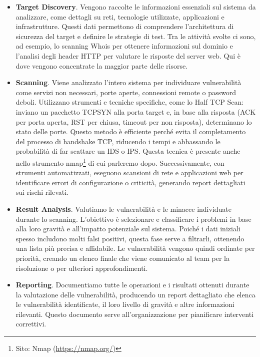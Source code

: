         \begin{itemize}
            \item \textbf{Target Discovery}. Vengono raccolte le informazioni essenziali sul sistema da analizzare, come dettagli su reti, tecnologie utilizzate, applicazioni e infrastrutture. Questi dati permettono di comprendere l'architettura di sicurezza del target e definire le strategie di test. Tra le attività svolte ci sono, ad esempio, lo scanning Whois per ottenere informazioni sul dominio e l'analisi degli header HTTP per valutare le risposte del server web. Qui è dove vengono concentrate la maggior parte delle risorse.
            \item \textbf{Scanning}.  Viene analizzato l'intero sistema per individuare vulnerabilità come servizi non necessari, porte aperte, connessioni remote o password deboli. Utilizzano strumenti e tecniche specifiche, come lo Half TCP Scan: inviano un pacchetto TCP\textunderscore SYN alla porta target e, in base alla risposta (ACK per porta aperta, RST per chiusa, timeout per non risposta), determinano lo stato delle porte. Questo metodo è efficiente perché evita il completamento del processo di handshake TCP, riducendo i tempi e abbassando le probabilità di far scattare un IDS o IPS. Questa tecnica è presente anche nello strumento nmap\footnote{Sito: Nmap (\url{https://nmap.org/})} di cui parleremo dopo. Successivamente, con strumenti automatizzati, eseguono scansioni di rete e applicazioni web per identificare errori di configurazione o criticità, generando report dettagliati sui rischi rilevati.
            \item \textbf{Result Analysis}. Valutiamo  le vulnerabilità e le minacce individuate durante lo scanning. L'obiettivo è selezionare e classificare i problemi in base alla loro gravità e all'impatto potenziale sul sistema. Poiché i dati iniziali spesso includono molti falsi positivi, questa fase serve a filtrarli, ottenendo una lista più precisa e affidabile. Le vulnerabilità vengono quindi ordinate per priorità, creando un elenco finale che viene comunicato al team per la risoluzione o per ulteriori approfondimenti.
            \item \textbf{Reporting}. Documentiamo tutte le operazioni e i risultati ottenuti durante la valutazione delle vulnerabilità, producendo un report dettagliato che elenca le vulnerabilità identificate, il loro livello di gravità e altre informazioni rilevanti. Questo documento serve all'organizzazione per pianificare interventi correttivi.
        \end{itemize}

